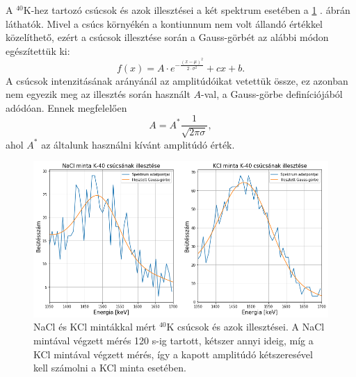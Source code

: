 \documentclass[12pt,a4paper]{article}
\begin{document}
\newline
A $^{40}$K-hez tartozó csúcsok és azok illesztései a két spektrum esetében a \ref{fig:6} . ábrán láthatók. Mivel a csúcs környékén a kontiunnum nem volt állandó értékkel közelíthető, ezért a csúcsok illesztése során a Gauss-görbét az alábbi módon egészítettük ki:
$$f(x)=A\cdot e^{-\frac{(x-\mu)^2}{2\cdot \sigma ^2}} + cx + b  .$$
A csúcsok intenzitásának arányánál az amplitúdóikat vetettük össze, ez azonban nem egyezik meg az illesztés során használt $A$-val, a Gauss-görbe definíciójából adódóan. Ennek megfelelően
$$A=A^{*}\frac{1}{\sqrt{2\pi \sigma}},$$
ahol $A^{*}$ az általunk használni kívánt amplitúdó érték.
\newpage
\begin{figure}[!h]
\centering
\includegraphics[scale=0.50]{K40_fits}
\caption{NaCl és KCl mintákkal mért $^{40}$K csúcsok és azok illesztései. A NaCl mintával végzett mérés 120 s-ig tartott, kétszer annyi ideig, míg a KCl mintával végzett mérés, így a kapott amplitúdó kétszeresével kell számolni a KCl minta esetében.}
\label{fig:6}
\end{figure}
\end{document}
